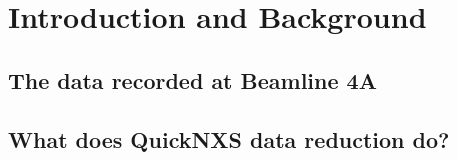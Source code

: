 \chapter{Introduction and Background}
\label{chap:introduction}

  \section{The data recorded at Beamline 4A}
  
  \section{What does QuickNXS data reduction do?}
